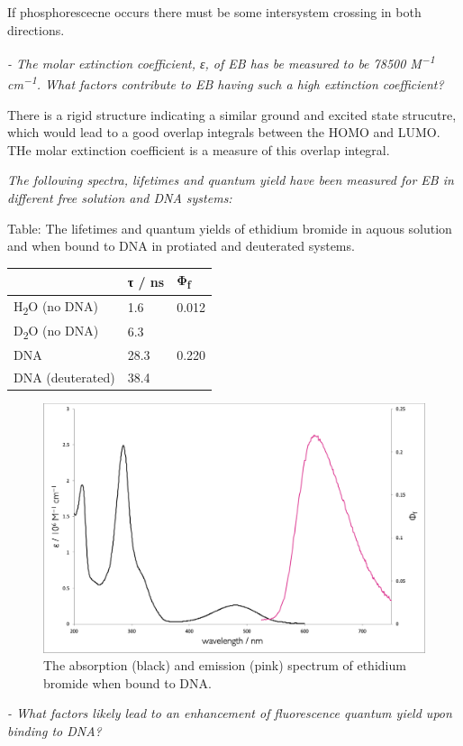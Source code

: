 \documentclass[
]{book}
\begin{document}
If phosphorescecne occurs there must be some intersystem crossing in both directions.

\emph{- The molar extinction coefficient, ε, of EB has be measured to be 78500 M\textsuperscript{−1} cm\textsuperscript{−1}. What factors contribute to EB having such a high extinction coefficient?}

There is a rigid structure indicating a similar ground and excited state strucutre, which would lead to a good overlap integrals between the HOMO and LUMO. THe molar extinction coefficient is a measure of this overlap integral.

\emph{The following spectra, lifetimes and quantum yield have been measured for EB in different free solution and DNA systems:}

Table: \label{tab:ethidiumlifetime} The lifetimes and quantum yields of ethidium bromide in aquous solution and when bound to DNA in protiated and deuterated systems.

\begin{longtable}[]{@{}lll@{}}
\toprule
& τ / ns & Φ\textsubscript{f}\tabularnewline
\midrule
\endhead
H\textsubscript{2}O (no DNA) & 1.6 & 0.012\tabularnewline
D\textsubscript{2}O (no DNA) & 6.3 &\tabularnewline
DNA & 28.3 & 0.220\tabularnewline
DNA (deuterated) & 38.4 &\tabularnewline
\bottomrule
\end{longtable}

\begin{figure}

{\centering \includegraphics[width=0.7\linewidth]{images/ethidiumspectra} 

}

\caption{The absorption (black) and emission (pink) spectrum of ethidium bromide when bound to DNA.}\label{fig:ethidiumspectra}
\end{figure}

\emph{- What factors likely lead to an enhancement of fluorescence quantum yield upon binding to DNA?}
\end{document}

